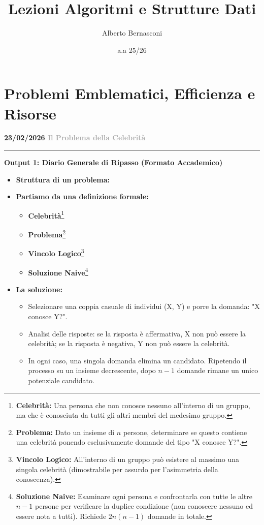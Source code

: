 \documentclass[a4paper, 11pt]{report}
\title{\textbf{Lezioni Algoritmi e Strutture Dati}}
\author{Alberto Bernasconi}
\date{a.a 25/26}
\newcommand{\lezione}[2]{
\vspace{2em}
\noindent\textbf{\Large #1 \hfill \textcolor{darkgray}{#2}}
\vspace{0.5em}
\hrule
\vspace{1.5em}
}
\newcommand{\definizione}[2]{%
\textbf{#1}\footnote{\textbf{#1:} #2}%
}
\begin{document}
\maketitle

\newpage

\tableofcontents

\newpage

\chapter{Problemi Emblematici, Efficienza e Risorse}

\lezione{23/02/2026}{Il Problema della Celebrità}
\vspace{0.5cm}
\textbf{Output 1: Diario Generale di Ripasso (Formato Accademico)}
\begin{itemize}
\item \textbf{Struttura di un problema:}
\item \textbf{Partiamo da una definizione formale:}
\begin{itemize}
\item \definizione{Celebrità}{Una persona che non conosce nessuno all'interno di un gruppo, ma che è conosciuta da tutti gli altri membri del medesimo gruppo.}
\item \definizione{Problema}{Dato un insieme di $n$ persone, determinare se questo contiene una celebrità ponendo esclusivamente domande del tipo "X conosce Y?".}
\item \definizione{Vincolo Logico}{All'interno di un gruppo può esistere al massimo una singola celebrità (dimostrabile per assurdo per l'asimmetria della conoscenza).}
\item \definizione{Soluzione Naive}{Esaminare ogni persona e confrontarla con tutte le altre $n-1$ persone per verificare la duplice condizione (non conoscere nessuno ed essere nota a tutti). Richiede $2n(n-1)$ domande in totale.}
\end{itemize}
\item \textbf{La soluzione:}
\begin{itemize}
\item Selezionare una coppia casuale di individui (X, Y) e porre la domanda: "X conosce Y?".
\item Analisi delle risposte: se la risposta è affermativa, X non può essere la celebrità; se la risposta è negativa, Y non può essere la celebrità.
\item In ogni caso, una singola domanda elimina un candidato. Ripetendo il processo su un insieme decrescente, dopo $n-1$ domande rimane un unico potenziale candidato.

\end{itemize}
\end{itemize}
\end{document}
